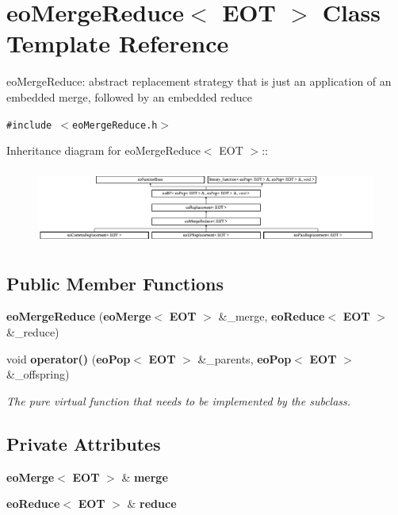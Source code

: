 \section{eo\-Merge\-Reduce$<$ EOT $>$ Class Template Reference}
\label{classeo_merge_reduce}
eo\-Merge\-Reduce: abstract replacement strategy that is just an application of an embedded merge, followed by an embedded reduce  


{\tt \#include $<$eo\-Merge\-Reduce.h$>$}

Inheritance diagram for eo\-Merge\-Reduce$<$ EOT $>$::\begin{figure}[H]
\begin{center}
\leavevmode
\includegraphics[height=2.50896cm]{classeo_merge_reduce}
\end{center}
\end{figure}
\subsection*{Public Member Functions}
\begin{CompactItemize}
\item 
{\bf eo\-Merge\-Reduce} ({\bf eo\-Merge}$<$ {\bf EOT} $>$ \&\_\-merge, {\bf eo\-Reduce}$<$ {\bf EOT} $>$ \&\_\-reduce)\label{classeo_merge_reduce_a0}

\item 
void {\bf operator()} ({\bf eo\-Pop}$<$ {\bf EOT} $>$ \&\_\-parents, {\bf eo\-Pop}$<$ {\bf EOT} $>$ \&\_\-offspring)\label{classeo_merge_reduce_a1}

\begin{CompactList}\small\item\em The pure virtual function that needs to be implemented by the subclass. \item\end{CompactList}\end{CompactItemize}
\subsection*{Private Attributes}
\begin{CompactItemize}
\item 
{\bf eo\-Merge}$<$ {\bf EOT} $>$ \& {\bf merge}\label{classeo_merge_reduce_r0}

\item 
{\bf eo\-Reduce}$<$ {\bf EOT} $>$ \& {\bf reduce}\label{classeo_merge_reduce_r1}

\end{CompactItemize}


